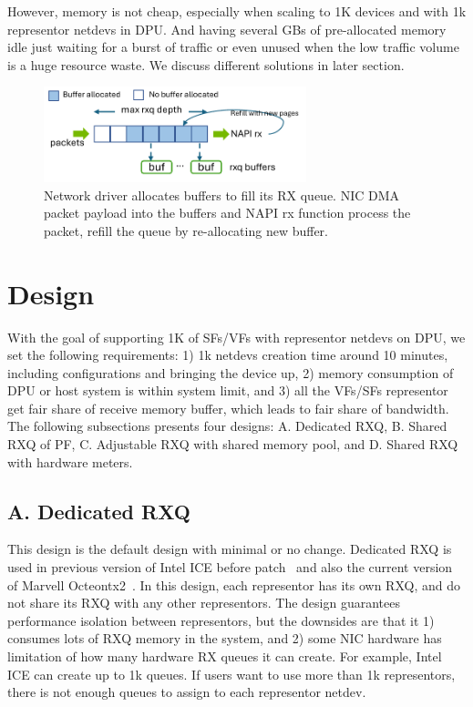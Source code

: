 \documentclass[letterpaper]{article}
\begin{document}
However, memory is not cheap, especially when scaling to 1K devices
and with 1k representor netdevs in DPU. And having several GBs of
pre-allocated memory idle just waiting for a burst of traffic
or even unused when the low traffic volume is a huge resource waste.
We discuss different solutions in later section.

\begin{figure}[t!]
\includegraphics[width=3.0in]{rxq.pdf}
\centering
\caption{Network driver allocates buffers to fill its RX queue. NIC DMA packet
payload into the buffers and NAPI rx function process the packet, refill the 
queue by re-allocating new buffer.}
\label{fig:rxq}
\end{figure}

\section{Design}
With the goal of supporting 1K of SFs/VFs with representor netdevs
on DPU, we set the following requirements: 1) 1k netdevs creation time
around 10 minutes, including configurations and bringing the device up,
2) memory consumption of DPU or host system is within
system limit, and 3) all the VFs/SFs representor get fair share
of receive memory buffer, which leads to fair share of bandwidth.
The following subsections presents four designs: A. Dedicated RXQ,
B. Shared RXQ of PF, C. Adjustable RXQ with shared memory pool, and
D. Shared RXQ with hardware meters.

\subsection{A. Dedicated RXQ}
This design is the default design with minimal or no change.
Dedicated RXQ is used in previous version of Intel ICE before patch~\cite{icepatch}
and also the current version of Marvell Octeontx2~\cite{octeontx2}.
In this design, each representor has its own RXQ, and do not share its
RXQ with any other representors. The design guarantees performance isolation
between representors, but the downsides are that it 1) consumes
lots of RXQ memory in the system, and 2) some NIC hardware has limitation of
how many hardware RX queues it can create. For example, Intel ICE can create up to
1k queues. If users want to use more than 1k representors, there is not
enough queues to assign to each representor netdev.
\end{document}
